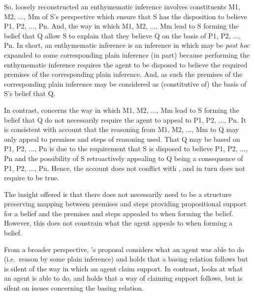 \begin{note}
  So, loosely reconstructed an enthymematic inference involves constituents M1, M2, \(\dots\), Mm of S's perspective which ensure that S has the disposition to believe P1, P2, \(\dots\), Pn.
  And, the way in which M1, M2, \(\dots\), Mm lead to S forming the belief that Q allow S to explain that they believe Q on the basis of P1, P2, \(\dots\), Pn.
  In short, an enthymematic inference is an inference in which may be \emph{post hoc} expanded to some corresponding plain inference (in part) because performing the enthymematic inference requires the agent to be disposed to believe the required premises of the corresponding plain inference.
  And, as such the premises of the corresponding plain inference may be considered as (constitutive of) the basis of S's belief that Q.

  In contrast, \ESU{} concerns the way in which M1, M2, \(\dots\), Mm lead to S forming the belief that Q do not necessarily require the agent to appeal to P1, P2, \(\dots\), Pn.
  It is consistent with \citeauthor{Moretti:2019wx} account that the reasoning from M1, M2, \(\dots\), Mm to Q may only appeal to premises and steps of reasoning used.
  That Q may be based on P1, P2, \(\dots\), Pn is due to the requirement that S is disposed to believe P1, P2, \(\dots\), Pn and the possibility of S retroactively appealing to Q being a consequence of P1, P2, \(\dots\), Pn.
  Hence, the account does not conflict with \ESU{}, and in turn does not require \EAS{} to be true.

  The insight offered is that there does not necessarily need to be a structure preserving mapping between premises and steps providing propositional support for a belief and the premises and steps appealed to when forming the belief.
  However, this does not constrain what the agent appeals to when forming a belief.

  From a broader perspective, \citeauthor{Moretti:2019wx}'s proposal considers what an agent was able to do (i.e.\ reason by some plain inference) and holds that a basing relation follows but is silent of the way in which an agent claim support.
  In contrast, \EAS{} looks at what an agent is able to do, and holds that a way of claiming support follows, but is silent on issues concerning the basing relation.
\end{note}

